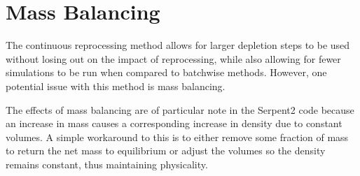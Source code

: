 






\section{Mass Balancing}

The continuous reprocessing method allows for larger depletion steps to be used without losing out on the impact of reprocessing, while also allowing for fewer simulations to be run when compared to batchwise methods. However, one potential issue with this method is mass balancing. 

The effects of mass balancing are of particular note in the Serpent2 code because an increase in mass causes a corresponding increase in density due to constant volumes. A simple workaround to this is to either remove some fraction of mass to return the net mass to equilibrium or adjust the volumes so the density remains constant, thus maintaining physicality.

